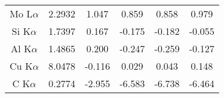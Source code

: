 \begin{table}[p]
\begin{tabular}{cccccc}
        Mo L$\alpha$ & 2.2932            & 1.047        & 0.859        & 0.858                                 & 0.979                                 \\
        Si K$\alpha$ & 1.7397            & 0.167        & -0.175       & -0.182                                & -0.055                                \\
        Al K$\alpha$ & 1.4865            & 0.200        & -0.247       & -0.259                                & -0.127                                \\
        Cu K$\alpha$ & 8.0478            & -0.116       & 0.029        & 0.043                                 & 0.148                                 \\
        C K$\alpha$  & 0.2774            & -2.955       & -6.583       & -6.738                                & -6.464
    \end{tabular}
\end{table}